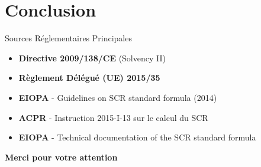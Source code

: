 \documentclass[10pt,aspectratio=169]{beamer}
\begin{document}
\section{Conclusion}
\begin{frame}{Sources Réglementaires Principales}
\begin{itemize}
\item \textbf{Directive 2009/138/CE} (Solvency II)
\item \textbf{Règlement Délégué (UE) 2015/35}
\item \textbf{EIOPA} - Guidelines on SCR standard formula (2014)
\item \textbf{ACPR} - Instruction 2015-I-13 sur le calcul du SCR
\item \textbf{EIOPA} - Technical documentation of the SCR standard formula
\end{itemize}
\end{frame}

\begin{frame}
\centering
\Large
\textbf{Merci pour votre attention}
\end{frame}
\end{document}
